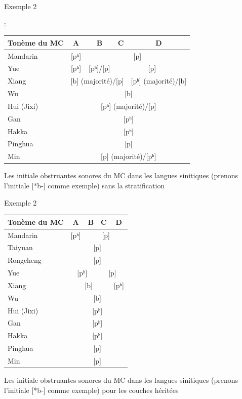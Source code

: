\documentclass[11pt]{beamer}
\begin{document}
\begin{frame}{Exemple 2}
\begin{scriptsize}
\textcite[511]{li2012pinghua} :
    \begin{tabular}{l|c|c|c|c}
    \toprule
    Tonème du MC & A     & B     & C     & D \\
    \midrule
    Mandarin & [pʰ]  & \multicolumn{3}{c}{[p]} \\
    Yue   & [pʰ]  & [pʰ]/[p] & \multicolumn{2}{c}{[p]} \\
    Xiang & \multicolumn{3}{c|}{[b] (majorité)/[p]} & [pʰ] (majorité)/[b] \\
    Wu    & \multicolumn{4}{c}{[b]} \\
    Hui (Jixi) & \multicolumn{4}{c}{[pʰ] (majorité)/[p]} \\
    Gan   & \multicolumn{4}{c}{[pʰ]} \\
    Hakka & \multicolumn{4}{c}{[pʰ]} \\
    Pinghua & \multicolumn{4}{c}{[p]} \\
    Min   & \multicolumn{4}{c}{[p] (majorité)/[pʰ]} \\
    \bottomrule
    \end{tabular}%
    
Les initiale obstruantes sonores du MC dans les langues sinitiques (prenons l'initiale [*b-] comme exemple) sans la stratification
\end{scriptsize}
\end{frame}

\begin{frame}{Exemple 2}
\begin{scriptsize}
    \begin{tabular}{l|c|c|c|c}
    \toprule
    Tonème du MC & A     & B     & C     & D \\
    \midrule
    Mandarin & [pʰ]  & \multicolumn{3}{c}{[p]} \\
    Taiyuan & \multicolumn{4}{c}{\cellcolor[rgb]{ .851,  .851,  .851}[p]} \\
    Rongcheng & \multicolumn{4}{c}{\cellcolor[rgb]{ .851,  .851,  .851}[p]} \\
    Yue   & \multicolumn{2}{c|}{[pʰ]} & \multicolumn{2}{c}{[p]} \\
    Xiang & \multicolumn{3}{c|}{[b]} & [pʰ] \\
    Wu    & \multicolumn{4}{c}{[b]} \\
    Hui (Jixi) & \multicolumn{4}{c}{[pʰ]} \\
    Gan   & \multicolumn{4}{c}{[pʰ]} \\
    Hakka & \multicolumn{4}{c}{[pʰ]} \\
    Pinghua & \multicolumn{4}{c}{[p]} \\
    Min   & \multicolumn{4}{c}{[p]} \\
    \bottomrule
    \end{tabular}%

Les initiale obstruantes sonores du MC dans les langues sinitiques (prenons l'initiale [*b-] comme exemple) pour les couches héritées
\end{scriptsize}
\end{frame}
\end{document}
